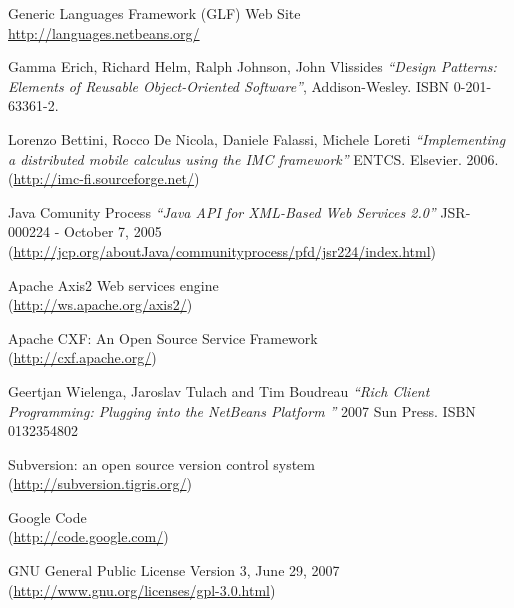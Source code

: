 \begin{thebibliography}{99}
 Generic Languages Framework (GLF) Web Site \\
\href{http://languages.netbeans.org/}{http://languages.netbeans.org/}

 Gamma Erich, Richard Helm, Ralph Johnson, John Vlissides
\emph{``Design Patterns: Elements of Reusable Object-Oriented Software''},
Addison-Wesley. ISBN 0-201-63361-2.

 Lorenzo Bettini, Rocco De Nicola, Daniele Falassi, Michele Loreti
\emph{``Implementing a distributed mobile calculus using the IMC framework''}
ENTCS. Elsevier. 2006.\\
(\href{http://imc-fi.sourceforge.net/}{http://imc-fi.sourceforge.net/})

 Java Comunity Process \emph{``Java API for XML-Based Web
Services 2.0''} JSR-000224 - October 7, 2005\\
(\href{http://jcp.org/aboutJava/communityprocess/pfd/jsr224/index.html}{http://jcp.org/aboutJava/communityprocess/pfd/jsr224/index.html})

 Apache Axis2 Web services engine \\
(\href{http://ws.apache.org/axis2/}{http://ws.apache.org/axis2/})

 Apache CXF: An Open Source Service Framework \\
(\href{http://cxf.apache.org/}{http://cxf.apache.org/})

 Geertjan Wielenga, Jaroslav Tulach and Tim Boudreau
\emph{``Rich Client Programming: Plugging into the NetBeans Platform ''} 2007
Sun Press. ISBN 0132354802

 Subversion: an open source version control system \\
(\href{http://subversion.tigris.org/}{http://subversion.tigris.org/})

 Google Code \\
(\href{http://code.google.com/}{http://code.google.com/})

 GNU General Public License Version 3, June 29, 2007\\ 
(\href{http://www.gnu.org/licenses/gpl-3.0.html}{http://www.gnu.org/licenses/gpl-3.0.html})

\end{thebibliography} 
